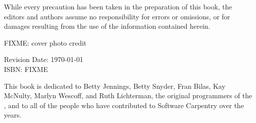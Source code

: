 \vspace{0.15cm}

\noindent While every precaution has been taken in the preparation of this
book, the editors and authors assume no responsibility for errors or omissions,
or for damages resulting from the use of the information contained herein.\\

\vspace{0.15cm}

\noindent FIXME: cover photo credit

\vspace{1cm}

\noindent Revision Date: \today \\

\noindent ISBN: FIXME
\normalsize

\newpage

\thispagestyle{empty}

\vspace*{5cm}

This book is dedicated to
Betty Jennings,
Betty Snyder,
Fran Bilas,
Kay McNulty,
Marlyn Wescoff,
and
Ruth Lichterman,
the original programmers of the
,
and to all of the people who have contributed to Software
Carpentry over the years.

\newpage

\thispagestyle{empty}
\mbox{}    %
